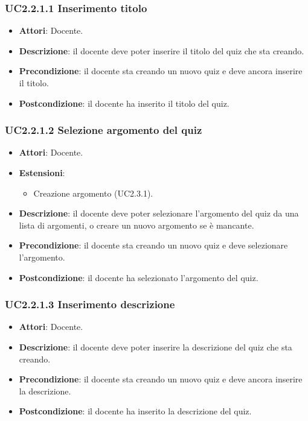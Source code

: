 \subsubsection{UC2.2.1.1 Inserimento titolo}
\begin{itemize}
\item \textbf{Attori}: Docente.
\item \textbf{Descrizione}: il docente deve poter inserire il titolo del quiz che sta creando.
\item \textbf{Precondizione}: il docente sta creando un nuovo quiz e deve ancora inserire il titolo.
\item \textbf{Postcondizione}: il docente ha inserito il titolo del quiz.
\end{itemize}
\subsubsection{UC2.2.1.2 Selezione argomento del quiz}
\begin{itemize}
\item \textbf{Attori}: Docente.
\item \textbf{Estensioni}:
\begin{itemize}
\item Creazione argomento (UC2.3.1).
\end{itemize}
\item \textbf{Descrizione}: il docente deve poter selezionare l'argomento del quiz da una lista di argomenti, o creare un nuovo argomento se è mancante.
\item \textbf{Precondizione}: il docente sta creando un nuovo quiz e deve selezionare l'argomento.
\item \textbf{Postcondizione}: il docente ha selezionato l'argomento del quiz.
\end{itemize}
\subsubsection{UC2.2.1.3 Inserimento descrizione}
\begin{itemize}
\item \textbf{Attori}: Docente.
\item \textbf{Descrizione}: il docente deve poter inserire la descrizione del quiz che sta creando.
\item \textbf{Precondizione}: il docente sta creando un nuovo quiz e deve ancora inserire la descrizione.
\item \textbf{Postcondizione}: il docente ha inserito la descrizione del quiz.
\end{itemize}
